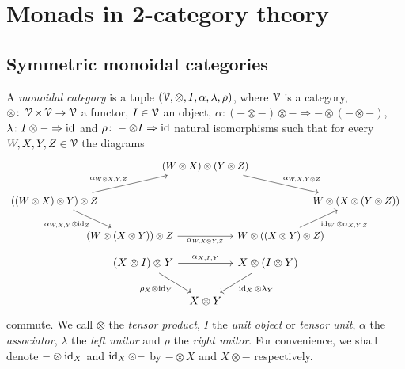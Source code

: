 \documentclass[a4paper,11pt,oneside,openany]{scrbook}
\begin{document}
\chapter{Monads in 2-category theory}

\section{Symmetric monoidal categories}

\begin{defn}
	A \emph{monoidal category} is a tuple $(\operatorname{\mathcal{V}},\otimes,I,\alpha,\lambda,\rho)$, where $\operatorname{\mathcal{V}}$ is a category, $\otimes\colon\operatorname{\mathcal{V}}\times\operatorname{\mathcal{V}}\rightarrow\operatorname{\mathcal{V}}$ a functor, $I\in\operatorname{\mathcal{V}}$ an object, $\alpha\colon(-\otimes-)\otimes-\Rightarrow-\otimes(-\otimes-)$, $\lambda\colon I\otimes-\Rightarrow\operatorname{id}$ and $\rho\colon-\otimes I\Rightarrow\operatorname{id}$ natural isomorphisms such that for every $W,X,Y,Z\in\operatorname{\mathcal{V}}$ the diagrams
	\[
		\begin{tikzcd}[column sep = -2.0em]
			& & (W \otimes X) \otimes (Y \otimes Z) \arrow[drr, "\alpha_{W, X, Y \otimes Z}"] \\
			((W \otimes X) \otimes Y) \otimes Z \arrow[urr, "\alpha_{W \otimes X, Y, Z}"] \arrow[dr,"\alpha_{W,X,Y} \otimes \id_Z", swap]
			& & & & W \otimes (X \otimes (Y \otimes Z)) \\
			& (W \otimes (X \otimes Y)) \otimes Z \arrow[rr, "\alpha_{W, X \otimes Y, Z}", swap]
			& & W \otimes ((X \otimes Y) \otimes Z) \arrow[ur, "\id_{W}\otimes\alpha_{X,Y,Z}", swap]
		\end{tikzcd}
	\]
	\[
		\begin{tikzcd}[column sep=tiny]
			(X\otimes I)\otimes Y\ar[rr, "\alpha_{X,I,Y}"]\ar[dr, "\rho_X\otimes\id_Y", swap]
			&& X\otimes (I\otimes Y)\ar[dl, "\id_X\otimes\lambda_Y"] \\
			& X\otimes Y
		\end{tikzcd}
	\]
	commute. We call $\otimes$ the \emph{tensor product}, $I$ the \emph{unit
    object} or \emph{tensor unit}, $\alpha$ the \emph{associator}, $\lambda$ the
    \emph{left unitor} and $\rho$ the \emph{right unitor}. For convenience, we
    shall denote $-\otimes\operatorname{id}_X$ and $\operatorname{id}_X\otimes -$ by $-\otimes X$ and
    $X\otimes-$ respectively.
\end{defn}
\end{document}

